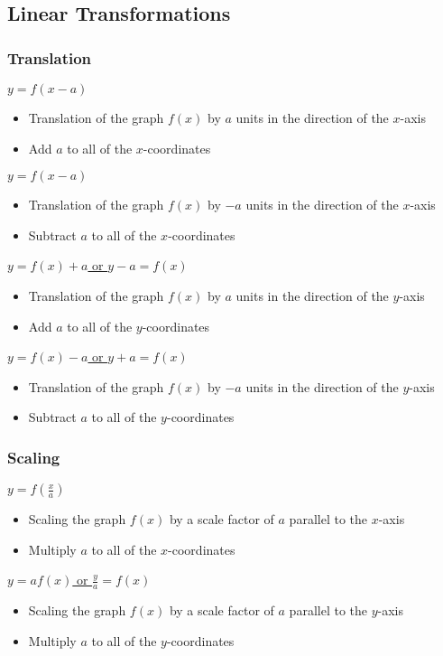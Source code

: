 \documentclass[../main.tex]{subfiles}
\begin{document}
\subsection{Linear Transformations}

\subsubsection{Translation}
\underline{\(y=f(x-a)\)}
\begin{itemize}
    \item Translation of the graph \(f(x)\) by \(a\) units in the direction of the \(x\)-axis
    \item Add \(a\) to all of the \(x\)-coordinates
\end{itemize}
\underline{\(y=f(x-a)\)}
\begin{itemize}
    \item Translation of the graph \(f(x)\) by \(-a\) units in the direction of the \(x\)-axis
    \item Subtract \(a\) to all of the \(x\)-coordinates
\end{itemize}
\underline{\(y=f(x)+a\) or \(y-a=f(x)\)}
\begin{itemize}
    \item Translation of the graph \(f(x)\) by \(a\) units in the direction of the \(y\)-axis
    \item Add \(a\) to all of the \(y\)-coordinates
\end{itemize}
\underline{\(y=f(x)-a\) or \(y+a=f(x)\)}
\begin{itemize}
    \item Translation of the graph \(f(x)\) by \(-a\) units in the direction of the \(y\)-axis
    \item Subtract \(a\) to all of the \(y\)-coordinates
\end{itemize}

\newpage

\subsubsection{Scaling}
\underline{\(\displaystyle y=f\left(\frac{x}{a}\right)\)}
\begin{itemize}
    \item Scaling the graph \(f(x)\) by a scale factor of \(a\) parallel to the \(x\)-axis
    \item Multiply \(a\) to all of the \(x\)-coordinates
\end{itemize}
\underline{\(y=af(x)\) or \(\displaystyle \frac{y}{a}=f(x)\)}
\begin{itemize}
    \item Scaling the graph \(f(x)\) by a scale factor of \(a\) parallel to the \(y\)-axis
    \item Multiply \(a\) to all of the \(y\)-coordinates
\end{itemize}
\end{document}
